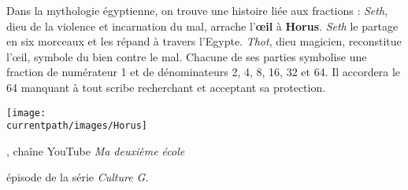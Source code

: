 \vspace*{-7mm}
\begin{changemargin}{-10mm}{-10mm}

\vspace*{-3mm}
\end{changemargin}
\vspace*{-13mm}
\begin{debat} 
   Dans la mythologie égyptienne, on trouve une histoire liée aux fractions : {\it Seth}, dieu de la violence et incarnation du mal, arrache l’{\bf œil} à {\bf Horus}. {\it Seth} le partage en six morceaux et les répand à travers l’Egypte. {\it Thot}, dieu magicien, reconstitue l’œil, symbole du bien contre le mal. Chacune de ses parties symbolise une fraction de numérateur 1 et de dénominateurs 2, 4, 8, 16, 32 et 64. Il accordera le 64 manquant à tout scribe recherchant et acceptant sa protection.
   \begin{center}
      \texttt{[image: \\currentpath/images/Horus]}
   \end{center}
    \bigskip
    \begin{cadre}[B2][J4]
       \begin{center}
         , chaîne YouTube {\it Ma deuxième école}
         
         \hfill épisode de la série {\it Culture G}.
       \end{center}
    \end{cadre}
 \end{debat}